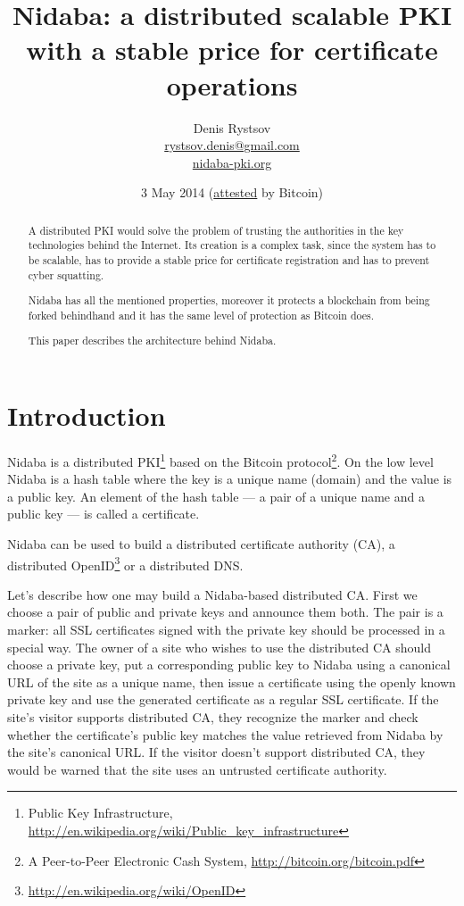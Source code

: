 \documentclass[12pt]{article}
\begin{document}
\title{Nidaba: a distributed scalable PKI with a stable price for certificate operations}
\date{3 May 2014 (\hyperlink{attest}{attested} by Bitcoin)}
\author{Denis Rystsov \\ 
\href{mailto:rystsov.denis@gmail.com}{rystsov.denis@gmail.com} \\
\href{http://nidaba-pki.org/}{nidaba-pki.org}}


\maketitle

\begin{abstract}
A distributed PKI would solve the problem of trusting the authorities in the key technologies behind the Internet. Its creation is a complex task, since the system has to be scalable, has to provide a stable price for certificate registration and has to prevent cyber squatting.

Nidaba has all the mentioned properties, moreover it protects a blockchain from being forked behindhand and it has the same level of protection as Bitcoin does.

This paper describes the architecture behind Nidaba.
\end{abstract}


\section{Introduction}

Nidaba is a distributed PKI\footnote{Public Key Infrastructure, \href{http://en.wikipedia.org/wiki/Public\_key\_infrastructure}{http://en.wikipedia.org/wiki/Public\_key\_infrastructure}} based on the Bitcoin protocol\footnote{A Peer-to-Peer Electronic Cash System, \href{http://bitcoin.org/bitcoin.pdf}{http://bitcoin.org/bitcoin.pdf}}. On the low level Nidaba is a hash table where the key is a unique name (domain) and the value is a public key. An element of the hash table — a pair of a unique name and a public key — is called a certificate.

Nidaba can be used to build a distributed certificate authority (CA), a distributed OpenID\footnote{\href{http://en.wikipedia.org/wiki/OpenID}{http://en.wikipedia.org/wiki/OpenID}} or a distributed DNS.

Let's describe how one may build a Nidaba-based distributed CA. First we choose a pair of public and private keys and announce them both. The pair is a marker: all SSL certificates signed with the private key should be processed in a special way. The owner of a site who wishes to use the distributed CA should choose a private key, put a corresponding public key to Nidaba using a canonical URL of the site as a unique name, then issue a certificate using the openly known private key and use the generated certificate as a regular SSL certificate. If the site's visitor supports distributed CA, they recognize the marker and check whether the certificate's public key matches the value retrieved from Nidaba by the site's canonical URL. If the visitor doesn't support distributed CA, they would be warned that the site uses an untrusted certificate authority.
\end{document}
